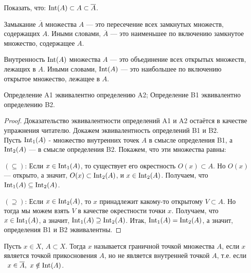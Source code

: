 \begin{exercise}
    Показать, что: $\operatorname{Int}(A) \subset A \subset \overline{A}$.
\end{exercise}

\begin{definition}[A2]
    Замыкание $\overline{A}$ множества $A$ --- это пересечение всех замкнутых множеств, содержащих $A$. Иными словами,
    $\overline{A}$ --- это наименьшее по включению замкнутое множество, содержащее $A$.

\end{definition}

\begin{definition}[B2]
    Внутренность $\operatorname{Int}(A)$ множества $A$ --- это объединение всех открытых множеств, лежащих в $A$. Иными словами,
    $\operatorname{Int}(A)$ --- это наибольшее по включению открытое множество, лежащее в $A$.
\end{definition}

\begin{theorem} %
    Определение A1 эквивалентно определению A2; Определение B1 эквивалентно определению B2.
\end{theorem}
\begin{proof}
    Доказательство эквивалентности определений A1 и A2 остаётся в качестве упражнения читателю.
    Докажем эквивалентность определений B1 и B2. \\
    Пусть $\operatorname{Int}_1(A)$ - множество внутренних точек $A$ в смысле определения B1, а $\operatorname{Int}_2(A)$ --- в смысле определения B2. Покажем, что эти множества равны:

    $(\subseteq)$: Если $x \in \operatorname{Int}_1(A)$, то существует его окрестность $O(x) \subset A$. Но $O(x)$ --- открыто, а значит, $O(x) \subset \operatorname{Int}_2(A)$, и $x \in \operatorname{Int}_2(A)$. Получаем, что $\operatorname{Int}_1(A) \subseteq \operatorname{Int}_2(A)$.
    
    $(\supseteq)$: Если $x \in \operatorname{Int}_2(A)$, то $x$ принадлежит какому-то открытому $V \subset A$. Но тогда мы можем взять $V$ в качестве окрестности точки $x$. Получаем, что $x \in \operatorname{Int}_1(A)$, а значит, $\operatorname{Int}_1(A) \supseteq \operatorname{Int}_2(A)$.
    Итак, $\operatorname{Int}_1(A) = \operatorname{Int}_2(A)$, а значит, определения B1 и B2 эквивалентны.
\end{proof}

\begin{definition}
    Пусть $x \in X$, $A \subset X$. Тогда $x$ называется граничной точкой множества $A$, если $x$ является точкой прикосновения $A$, но не является внутренней точкой $A$, т.е. если \ $x \in \overline{A}, \ x \notin \operatorname{Int}(A)$.
\end{definition}

